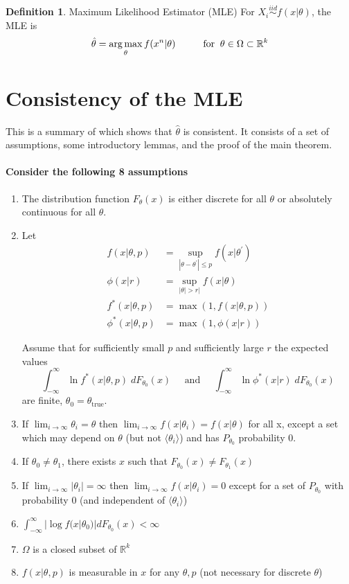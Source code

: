 \documentclass[letterpaper,11pt]{article}
\newcommand{\R}{\mathbb{R}}
\DeclareMathOperator*{\argmax}{arg\,max}
\theoremstyle{definition}
\newcounter{defn}
\newtheorem{defn}[defn]{Definition}
\begin{document}
\begin{defn}{Maximum Likelihood Estimator (MLE)}
For $X_i \overset{iid}{\sim} f(x|\theta)$, the MLE is $$\hat\theta = \argmax_\theta f(x^n|\theta) \text{\hspace{1cm}for}\;\; \theta\in\Omega\subset \R^k$$
\end{defn}

\section{Consistency of the MLE}
This is a summary of \citet{waldNoteConsistencyMaximum1949} which shows that $\hat\theta$ is consistent. It consists of a set of assumptions, some introductory lemmas, and the proof of the main theorem.

\paragraph{Consider the following 8 assumptions}
\begin{enumerate}
\item The distribution function $F_\theta(x)$ is either discrete for all $\theta$ or absolutely continuous for all $\theta$.
\item Let \vspace{-1em}
\begin{align*}
\displaystyle f(x|\theta, p) &= \sup_{|\theta-\theta^\prime|\leq p} f(x|\theta^\prime)\\
\displaystyle \phi(x|r) &= \sup_{|\theta| > r|} f(x|\theta)\\
\displaystyle f^\ast(x|\theta,p) &= \max(1, f(x|\theta,p))\\
\displaystyle \phi^\ast(x|\theta,p) &= \max(1, \phi(x|r))
\end{align*}

Assume that for sufficiently small $p$ and sufficiently large $r$ the expected values
$$\int_{-\infty}^\infty \ln f^\ast(x|\theta,p) \;dF_{\theta_0}(x) \;\;\;\;\;\text{and}\;\;\;\;\;
  \int_{-\infty}^\infty \ln \phi^\ast(x|r) \;dF_{\theta_0}(x)$$
are finite, $\theta_0 = \theta_{\text{true}}$.

\item If $\displaystyle \lim_{i\rightarrow\infty}\theta_i = \theta$ then $\displaystyle \lim_{i\rightarrow\infty} f(x|\theta_i) = f(x|\theta)$ for all x, except a set which may depend on $\theta$ (but not $\langle\theta_i\rangle$) and has $P_{\theta_0}$ probability 0.
\item If $\theta_0 \neq \theta_1$, there exists $x$ such that $F_{\theta_0}(x) \neq F_{\theta_1}(x)$
\item If $\displaystyle \lim_{i\rightarrow\infty}|\theta_i| = \infty$ then $\displaystyle \lim_{i\rightarrow\infty} f(x|\theta_i) = 0$ except for a set of $P_{\theta_0}$ with probability 0 (and independent of $\langle\theta_i\rangle$)
\item $\int_{-\infty}^\infty |\log f(x|\theta_0)| dF_{\theta_0}(x) < \infty$
\item $\Omega$ is a closed subset of $\R^k$
\item $f(x|\theta,p)$ is measurable in $x$ for any $\theta, p$ (not necessary for discrete $\theta$)
\end{enumerate}
\end{document}
